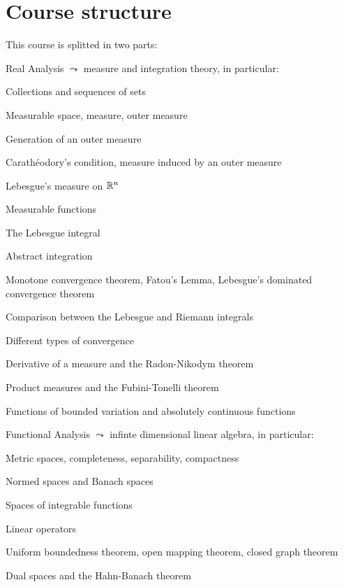 
\setcounter{chapter}{-1}
\chapter{Course structure}
\thispagestyle{empty}

This course is splitted in two parts:
\begin{enumerate}{
	\item Real Analysis $\leadsto$ measure and integration theory, in particular:
	\begin{itemize}{
		\item Collections and sequences of sets
		\item Measurable space, measure, outer measure
		\item Generation of an outer measure
		\item Carathéodory's condition, measure induced by an outer measure
		\item Lebesgue's measure on $\mathbb{R}^n$
		\item Measurable functions
		\item The Lebesgue integral
		\item Abstract integration
		\item Monotone convergence theorem, Fatou's Lemma, Lebesgue's dominated convergence theorem
		\item Comparison between the Lebesgue and Riemann integrals
		\item Different types of convergence
		\item Derivative of a measure and the Radon-Nikodym theorem
		\item Product measures and the Fubini-Tonelli theorem
		\item Functions of bounded variation and absolutely continuous functions
	}
	\end{itemize}
	\item Functional Analysis $\leadsto$ infinte dimensional linear algebra, in particular:
	\begin{itemize}{
		\item Metric spaces, completeness, separability, compactness
		\item Normed spaces and Banach spaces
		\item Spaces of integrable functions
		\item Linear operators
		\item Uniform boundedness theorem, open mapping theorem, closed graph theorem
		\item Dual spaces and the Hahn-Banach theorem
}
\end{itemize}}
\end{enumerate}
